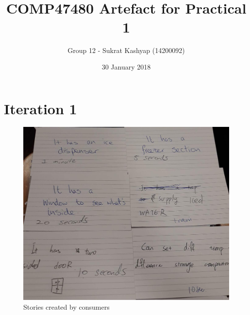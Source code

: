 \documentclass[12pt]{article}
\title{\vspace{-4.0cm}COMP47480 Artefact for Practical 1}
\author{Group 12 - Sukrat Kashyap (14200092)}
\date{30 January 2018}
\begin{document}
\maketitle

\section{Iteration 1}

\begin{figure}[!htb]
    \includegraphics[width=\linewidth]{iteration-1-cards.png}
    \caption{Stories created by consumers}
\end{figure}
\end{document}
